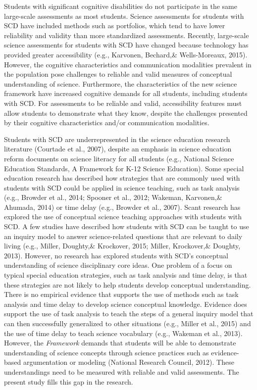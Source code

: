 \documentclass[11.5pt]{sig-alternate} %
\begin{document}
\begin{large}
Students with significant cognitive disabilities do not participate in the same large-scale assessments as most students. Science assessments for students with SCD have included methods such as portfolios, which tend to have lower reliability and validity than more standardized assessments. Recently, large-scale science assessments for students with SCD have changed because technology has provided greater accessibility (e.g., Karvonen, Bechard,\& Wells-Moreaux, 2015). However, the cognitive characteristics and communication modalities prevalent in the population pose challenges to reliable and valid measures of conceptual understanding of science. Furthermore, the characteristics of the new science framework have increased cognitive demands for all students, including students with SCD. For assessments to be reliable and valid, accessibility features must allow students to demonstrate what they know, despite the challenges presented by their cognitive characteristics and/or communication modalities. 

Students with SCD are underrepresented in the science education research literature (Courtade et al., 2007), despite an emphasis in science education reform documents on science literacy for all students (e.g., National Science Education Standards, A Framework for K-12 Science Education). Some special education research has described how strategies that are commonly used with students with SCD could be applied in science teaching, such as task analysis (e.g., Browder et al., 2014; Spooner et al., 2012; Wakeman, Karvonen,\& Ahumada, 2014) or time delay (e.g., Browder et al., 2007). Scant research has explored the use of conceptual science teaching approaches with students with SCD. A few studies have described how students with SCD can be taught to use an inquiry model to answer science-related questions that are relevant to daily living (e.g., Miller, Doughty,\& Krockover, 2015; Miller, Krockover,\& Doughty, 2013). However, no research has explored students with SCD's conceptual understanding of science disciplinary core ideas. One problem of a focus on typical special education strategies, such as task analysis and time delay, is that these strategies are not likely to help students develop conceptual understanding. There is no empirical evidence that supports the use of methods such as task analysis and time delay to develop science conceptual knowledge. Evidence does support the use of task analysis to teach the steps of a general inquiry model that can then successfully generalized to other situations (e.g., Miller et al., 2015) and the use of time delay to teach science vocabulary (e.g., Wakeman et al., 2013). However, the \textit{Framework} demands that students will be able to demonstrate understanding of science concepts through science practices such as evidence-based argumentation or modeling (National Research Council, 2012). These understandings need to be measured with reliable and valid assessments. The present study fills this gap in the research.


\end{large}
\end{document}
